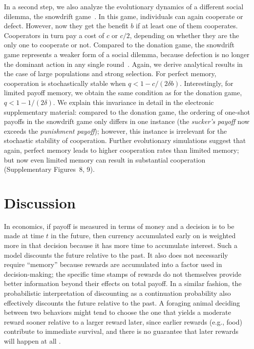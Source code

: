 \documentclass[11pt]{article}
\def\esm{electronic supplementary material}
\theoremstyle{plainCl1}
\theoremstyle{plainCl2}
\begin{document}
In a second step, we also analyze the evolutionary dynamics of a different social dilemma, the snowdrift game~\cite{doebeli:Ecology:2005}. 
In this game, individuals can again cooperate or defect. 
However, now they get the benefit $b$ if at least one of them cooperates. 
Cooperators in turn pay a cost of $c$ or $c/2$, depending on whether they are the only one to cooperate or not. 
Compared to the donation game, the snowdrift game represents a weaker form of a social dilemma, because defection is no longer the dominant action in any single round~\citep{nowak:JTB:2012}.
Again, we derive analytical results in the case of large populations and strong selection. 
For perfect memory, cooperation is stochastically stable when \(q < 1 \!-\! c/(2 \delta b)\). 
Interestingly, for limited payoff memory, we obtain the same condition as for the donation game, \(q < 1 \!-\! 1/(2 \delta)\). 
We explain this invariance in detail in the \esm{}: compared to the donation game, the ordering of one-shot payoffs in the snowdrift game only differs in one instance (the {\it sucker's payoff} now exceeds the {\it punishment payoff}); however, this instance is irrelevant for the stochastic stability of cooperation. 
Further evolutionary simulations suggest that again, perfect memory leads to higher cooperation rates than limited memory; but now even limited memory can result in substantial cooperation (Supplementary Figures~8, 9). 



\section{Discussion}\label{section:discussion}
%
In economics, if payoff is measured in terms of money and a decision is to be made at time $t$ in the future, then currency accumulated early on is weighted more in that decision because it has more time to accumulate interest. Such a model discounts the future relative to the past. It also does not necessarily require ``memory'' because rewards are accumulated into a factor used in decision-making; the specific time stamps of rewards do not themselves provide better information beyond their effects on total payoff. In a similar fashion, the probabilistic interpretation of discounting as a continuation probability \citep{axelrod1981evolution} also effectively discounts the future relative to the past. A foraging animal deciding between two behaviors might tend to choose the one that yields a moderate reward sooner relative to a larger reward later, since earlier rewards (e.g., food) contribute to immediate survival, and there is no guarantee that later rewards will happen at all \citep{stephens1986foraging}.
\end{document}

